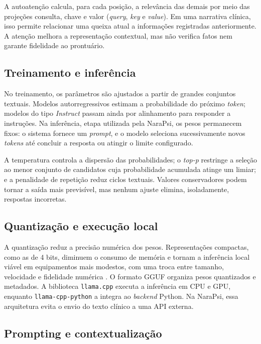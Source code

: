 A autoatenção calcula, para cada posição, a relevância das demais por meio das projeções consulta, chave e valor (\textit{query}, \textit{key} e \textit{value}). Em uma narrativa clínica, isso permite relacionar uma queixa atual a informações registradas anteriormente. A atenção melhora a representação contextual, mas não verifica fatos nem garante fidelidade ao prontuário.

\subsection{Treinamento e inferência}

No treinamento, os parâmetros são ajustados a partir de grandes conjuntos textuais. Modelos autorregressivos estimam a probabilidade do próximo \textit{token}; modelos do tipo \textit{Instruct} passam ainda por alinhamento para responder a instruções. Na inferência, etapa utilizada pela NaraPsi, os pesos permanecem fixos: o sistema fornece um \textit{prompt}, e o modelo seleciona sucessivamente novos \textit{tokens} até concluir a resposta ou atingir o limite configurado.

A temperatura controla a dispersão das probabilidades; o \textit{top-p} restringe a seleção ao menor conjunto de candidatos cuja probabilidade acumulada atinge um limiar; e a penalidade de repetição reduz ciclos textuais. Valores conservadores podem tornar a saída mais previsível, mas nenhum ajuste elimina, isoladamente, respostas incorretas.

\subsection{Quantização e execução local}

A quantização reduz a precisão numérica dos pesos. Representações compactas, como as de 4 bits, diminuem o consumo de memória e tornam a inferência local viável em equipamentos mais modestos, com uma troca entre tamanho, velocidade e fidelidade numérica \cite{vincentis2023efficient}. O formato GGUF organiza pesos quantizados e metadados. A biblioteca \texttt{llama.cpp} executa a inferência em CPU e GPU, enquanto \texttt{llama-cpp-python} a integra ao \textit{backend} Python. Na NaraPsi, essa arquitetura evita o envio do texto clínico a uma API externa.

\subsection{Prompting e contextualização}

